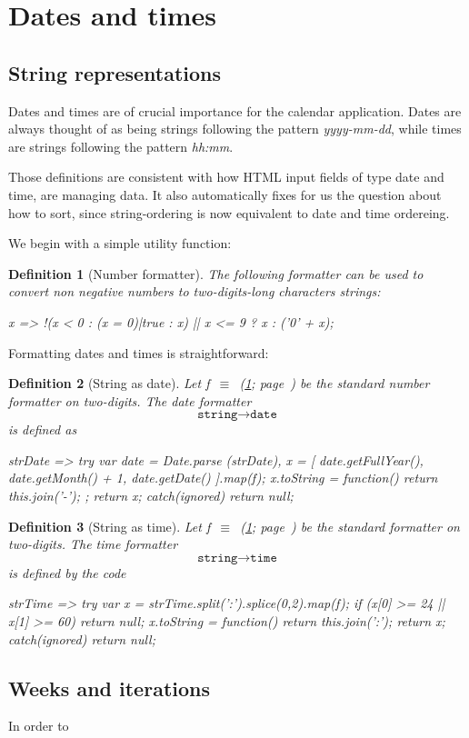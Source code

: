 \documentclass[12pt,a4paper]{report}
\newtheorem{definition}{Definition}
\newcommand{\word}[1]{\texttt{#1}}
\newcommand{\symboldef}[2]{#1\ $\equiv$\ (\ref{#2}; page~\pageref{#2})}
\begin{document}
\section{Dates and times}

\subsection{String representations}

Dates and times are of crucial importance for the calendar application.
Dates are always thought of as being strings following the pattern
\textit{yyyy-mm-dd}, while times are strings following the pattern
\textit{hh:mm}.

Those definitions are consistent with how HTML input fields of type
date and time, are managing data. It also automatically fixes for us the
question about how to sort, since string-ordering is now equivalent to
date and time ordereing.

We begin with a simple utility function:
\begin{definition}[Number formatter]\label{number_format}
The following formatter can be used to convert non negative numbers to
two-digits-long characters strings:
\begin{code}
x => !(x < 0 : (x = 0)|true : x) ||  x <= 9 ? x : ('0' + x);
\end{code}
\end{definition}

Formatting dates and times is straightforward:

\begin{definition}[String as date]\label{as_date}
Let \symboldef{f}{number_format} be the standard number formatter on
two-digits. The date formatter
	\[ \word{string} \to \word{date} \]
is defined as
\begin{code}
strDate => { try {
  var date = Date.parse (strDate),
         x = [
               date.getFullYear(),
               date.getMonth() + 1,
               date.getDate()
             ].map(f);
  x.toString = function() {
    return this.join('-');
  };
  return x;
} catch(ignored) { return null; } }
\end{code}
\end{definition}

\begin{definition}[String as time]\label{as_time}
Let \symboldef{f}{number_format} be the standard formatter on two-digits.
The time formatter
	\[ \word{string} \to \word{time} \]
is defined by the code
\begin{code}
strTime => { try {
  var x = strTime.split(':').splice(0,2).map(f);
  if (x[0] >= 24 || x[1] >= 60) return null;
  x.toString = function() {
    return this.join(':');
  }
  return x;
} catch(ignored) { return null; } }
\end{code}
\end{definition}

\subsection{Weeks and iterations}

In order to
\end{document}
